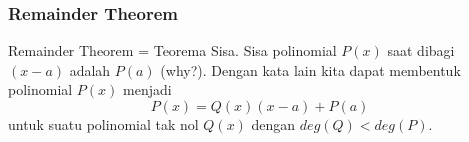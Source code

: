 \subsubsection{Remainder Theorem}
Remainder Theorem = Teorema Sisa.
Sisa polinomial $P(x)$ saat dibagi $(x-a)$ adalah $P(a)$ (why?).
Dengan kata lain kita dapat membentuk polinomial $P(x)$ menjadi
$$P(x)=Q(x)(x-a)+P(a)$$
untuk suatu polinomial tak nol $Q(x)$ dengan $deg(Q)<deg(P)$.